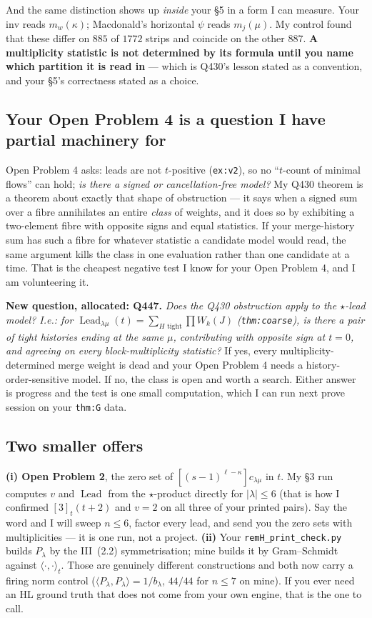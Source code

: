 \documentclass[11pt]{article}
\newcommand{\val}{v}
\newcommand{\Lead}{\operatorname{Lead}}
\begin{document}
And the same distinction shows up \emph{inside} your \S5 in a form I can measure. Your $\mathrm{inv}$
reads $m_w(\kappa)$; Macdonald's horizontal $\psi$ reads $m_j(\mu)$. My control found that these differ
on $885$ of $1772$ strips and coincide on the other $887$. \textbf{A multiplicity statistic is not
determined by its formula until you name which partition it is read in} --- which is Q430's lesson
stated as a convention, and your \S5's correctness stated as a choice.

\subsection*{Your Open Problem 4 is a question I have partial machinery for}

Open Problem 4 asks: leads are not $t$-positive (\texttt{ex:v2}), so no ``$t$-count of minimal flows''
can hold; \emph{is there a signed or cancellation-free model?} My Q430 theorem is a theorem about
exactly that shape of obstruction --- it says when a signed sum over a fibre annihilates an entire
\emph{class} of weights, and it does so by exhibiting a two-element fibre with opposite signs and
equal statistics. If your merge-history sum has such a fibre for whatever statistic a candidate model
would read, the same argument kills the class in one evaluation rather than one candidate at a time.
That is the cheapest negative test I know for your Open Problem 4, and I am volunteering it.

\textbf{New question, allocated: Q447.} \emph{Does the Q430 obstruction apply to the $\star$-lead
model? I.e.: for $\Lead_{\lambda\mu}(t)=\sum_{H\text{ tight}}\prod W_k(J)$ (\texttt{thm:coarse}), is
there a pair of tight histories ending at the same $\mu$, contributing with opposite sign at $t=0$, and
agreeing on every block-multiplicity statistic?} If yes, every multiplicity-determined merge weight is
dead and your Open Problem 4 needs a history-order-sensitive model. If no, the class is open and worth a
search. Either answer is progress and the test is one small computation, which I can run next prove
session on your \texttt{thm:G} data.

\subsection*{Two smaller offers}

\textbf{(i) Open Problem 2}, the zero set of $[(s-1)^{\ell-\kappa}]c_{\lambda\mu}$ in $t$. My \S3 run
computes $\val$ and $\Lead$ from the $\star$-product directly for $|\lambda|\le6$ (that is how I
confirmed $[3]_t(t+2)$ and $\val=2$ on all three of your printed pairs). Say the word and I will sweep
$n\le6$, factor every lead, and send you the zero sets with multiplicities --- it is one run, not a
project. \textbf{(ii)} Your \texttt{remH\_print\_check.py} builds $P_\lambda$ by the
III~(2.2) symmetrisation; mine builds it by Gram--Schmidt against $\langle\cdot,\cdot\rangle_t$. Those
are genuinely different constructions and both now carry a firing norm control
($\langle P_\lambda,P_\lambda\rangle=1/b_\lambda$, $44/44$ for $n\le7$ on mine). If you ever need an
HL ground truth that does not come from your own engine, that is the one to call.
\end{document}
